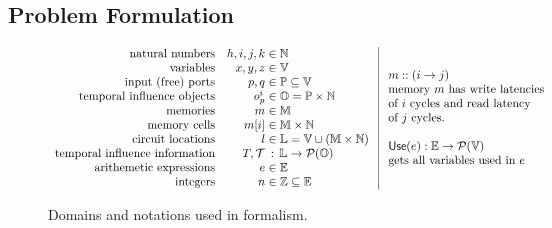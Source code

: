 \subsection{Problem Formulation}

\begin{figure}[tp]
    \[
    \begin{array}{rr@{\hspace{3pt}}l}
        \text{natural numbers} & h, i, j, k & \in \nats\\
        \text{variables} & x, y, z & \in \variables\\
        \text{input (free) ports} & p, q & \in \ports \subseteq \variables\\
        \text{temporal influence objects} & o_p^i & \in \objects = \ports \times \nats\\
        \text{memories} & m & \in \memories\\
        \text{memory cells} & m[i] & \in \memories \times \nats\\
        \text{circuit locations} & l & \in \locations = \variables \cup (\memories \times \nats)\\
        \text{temporal influence information} & T, \absT & \hspace{1.75pt}:\hspace{1.75pt} \locations \to \powerset(\objects)\\
        \text{arithemetic expressions} & e & \in \expressions\\
        \text{integers} & n & \in \ints \subseteq \expressions\\
    \end{array}
    \hspace{3pt}
    \vline
    \hspace{3pt}
    \begin{array}{l}
        m :: (i \to j) \\
        \text{memory $m$ has write latencies} \\
        \text{of $i$ cycles and read latency}\\
        \text{of $j$ cycles.}\\
        \\
        \Use(e) : \expressions \to \powerset(\variables) \\
        \text{gets all variables used in $e$}
    \end{array}
    \]
    \caption{Domains and notations used in formalism.}\label{fig:domains}
\end{figure}

